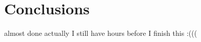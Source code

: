 \documentclass[letterpaper]{article}
\begin{document}
%

\section{Conclusions}

almost done
actually I still have hours before I finish this :(((

\end{document}
